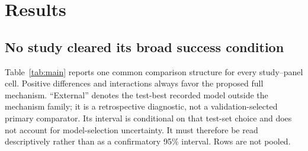 \documentclass{crebss}
\begin{document}
\section{Results}

\subsection{No study cleared its broad success condition}

Table~\ref{tab:main} reports one common comparison structure for every study--panel cell. Positive differences and interactions always favor the proposed full mechanism. ``External'' denotes the test-best recorded model outside the mechanism family; it is a retrospective diagnostic, not a validation-selected primary comparator. Its interval is conditional on that test-set choice and does not account for model-selection uncertainty. It must therefore be read descriptively rather than as a confirmatory 95\% interval. Rows are not pooled.
\end{document}
